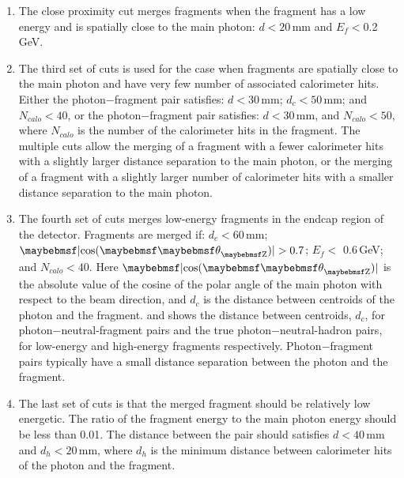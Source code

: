 \begin{enumerate}

  \item The close proximity cut merges fragments  when the fragment has a low energy and is spatially close to the main photon: $d < 20 $\,mm and  $E_f<$0.2\,GeV.
  \item The third set of cuts is used for the case when fragments are spatially close to the main photon and have very few number of associated calorimeter hits. Either the  photon$-$fragment pair satisfies:  $d < 30 $\,mm; $d_c < 50 $\,mm; and $N_{calo}<40$, or the  photon$-$fragment pair satisfies: $d < 30 $\,mm, and $N_{calo}<50$, where $N_{calo}$ is the number of the calorimeter  hits  in the fragment. The multiple cuts allow the merging of a fragment with a fewer  calorimeter hits with a slightly larger distance separation to the main photon, or the merging of a fragment with a slightly larger number of  calorimeter hits with a smaller distance separation to the main photon.

  \item The fourth set of  cuts merges low-energy fragments in the  endcap region of the detector. Fragments are merged if: $d_c < 60$\,mm; $\absCosTheta > 0.7$; $E_f<$ 0.6\,GeV; and $N_{calo}<40$. Here $\absCosTheta$ is the absolute value of the cosine of the polar angle of the main photon with respect to the beam direction, and $d_c$ is the distance between centroids of the photon and the fragment.  and  shows the distance between centroids, $d_c$,  for photon$-$neutral-fragment pairs and the true photon$-$neutral-hadron pairs, for low-energy and high-energy fragments respectively. Photon$-$fragment pairs typically have a small distance separation between the photon and the fragment.

  \item The last set of  cuts is that the merged fragment should be relatively low energetic. The ratio of the fragment energy  to the main photon energy should be less than 0.01. The distance between the pair should satisfies $d < 40$\,mm and $d_h < 20$\,mm, where  $d_h$ is the minimum distance between calorimeter hits of the photon and the fragment.
\end{enumerate}




